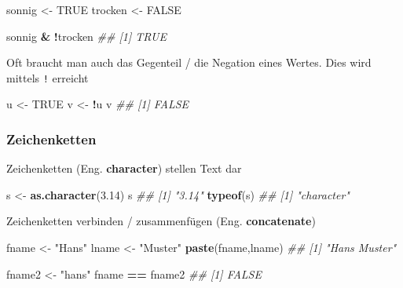 \documentclass[]{book}
\newenvironment{Shaded}{\begin{snugshade}}{\end{snugshade}}
\newcommand{\CommentTok}[1]{\textcolor[rgb]{0.56,0.35,0.01}{\textit{#1}}}
\newcommand{\FloatTok}[1]{\textcolor[rgb]{0.00,0.00,0.81}{#1}}
\newcommand{\KeywordTok}[1]{\textcolor[rgb]{0.13,0.29,0.53}{\textbf{#1}}}
\newcommand{\NormalTok}[1]{#1}
\newcommand{\OperatorTok}[1]{\textcolor[rgb]{0.81,0.36,0.00}{\textbf{#1}}}
\newcommand{\OtherTok}[1]{\textcolor[rgb]{0.56,0.35,0.01}{#1}}
\newcommand{\StringTok}[1]{\textcolor[rgb]{0.31,0.60,0.02}{#1}}
\begin{document}
\begin{Shaded}
\begin{Highlighting}[]
\NormalTok{sonnig <-}\StringTok{ }\OtherTok{TRUE}
\NormalTok{trocken <-}\StringTok{ }\OtherTok{FALSE}

\NormalTok{sonnig }\OperatorTok{&}\StringTok{ }\OperatorTok{!}\NormalTok{trocken}
\CommentTok{## [1] TRUE}
\end{Highlighting}
\end{Shaded}

Oft braucht man auch das Gegenteil / die Negation eines Wertes. Dies wird mittels \texttt{!} erreicht

\begin{Shaded}
\begin{Highlighting}[]
\NormalTok{u <-}\StringTok{ }\OtherTok{TRUE}
\NormalTok{v <-}\StringTok{ }\OperatorTok{!}\NormalTok{u }
\NormalTok{v}
\CommentTok{## [1] FALSE}
\end{Highlighting}
\end{Shaded}

\hypertarget{zeichenketten}{%
\subsubsection{Zeichenketten}\label{zeichenketten}}

Zeichenketten (Eng. \textbf{character}) stellen Text dar

\begin{Shaded}
\begin{Highlighting}[]
\NormalTok{s <-}\StringTok{ }\KeywordTok{as.character}\NormalTok{(}\FloatTok{3.14}\NormalTok{)}
\NormalTok{s}
\CommentTok{## [1] "3.14"}
\KeywordTok{typeof}\NormalTok{(s)}
\CommentTok{## [1] "character"}
\end{Highlighting}
\end{Shaded}

Zeichenketten verbinden / zusammenfügen (Eng. \textbf{concatenate})

\begin{Shaded}
\begin{Highlighting}[]
\NormalTok{fname <-}\StringTok{ "Hans"}
\NormalTok{lname <-}\StringTok{ "Muster"}
\KeywordTok{paste}\NormalTok{(fname,lname)}
\CommentTok{## [1] "Hans Muster"}

\NormalTok{fname2 <-}\StringTok{ "hans"}
\NormalTok{fname }\OperatorTok{==}\StringTok{ }\NormalTok{fname2}
\CommentTok{## [1] FALSE}
\end{Highlighting}
\end{Shaded}
\end{document}
